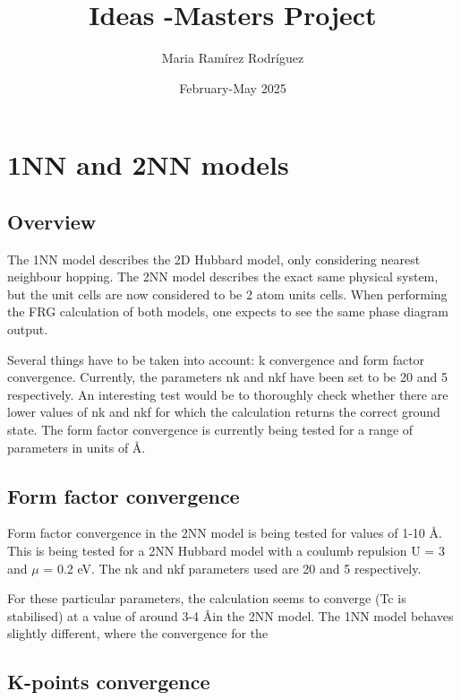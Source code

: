 \documentclass{article}
\title{Ideas -Masters Project}
\author{Maria Ramírez Rodríguez}
\date{February-May 2025}
\begin{document}
\maketitle

\section{1NN and 2NN models}

\subsection{Overview}

The 1NN model describes the 2D Hubbard model, only considering nearest neighbour hopping.
The 2NN model describes the exact same physical system, but the unit cells are now considered to be 2 atom units cells. 
When performing the FRG calculation of both models, one expects to see the same phase diagram output.

Several things have to be taken into account: k convergence and form factor convergence.
Currently, the parameters nk and nkf have been set to be 20 and 5 respectively. An interesting test would be to thoroughly check whether there are lower values of nk and nkf for which the calculation returns the correct ground state.
The form factor convergence is currently being tested for a range of parameters in units of \AA.



\subsection{Form factor convergence}

Form factor convergence in the 2NN model is being tested for values of 1-10 \AA. This is being tested for a 2NN Hubbard model with a coulumb repulsion U = 3 and $\mu$ = 0.2 eV.
The nk and nkf parameters used are 20 and 5 respectively. 

For these particular parameters, the calculation seems to converge (Tc is stabilised) at a value of around 3-4 \AA in the 2NN model. The 1NN model behaves slightly different, where the convergence for the 


\subsection{K-points convergence}
\end{document}
